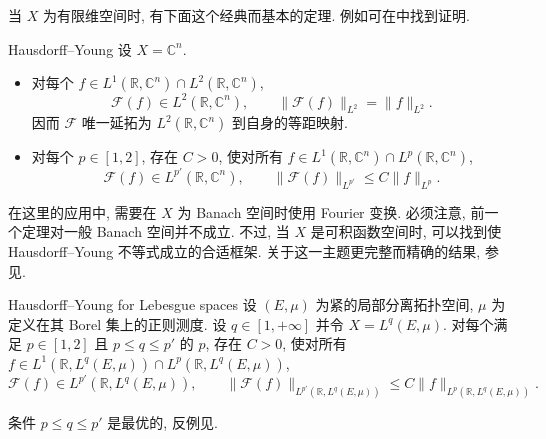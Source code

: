 当 $X$ 为有限维空间时, 有下面这个经典而基本的定理. 例如可在中找到证明.

\begin{Theorem}{Hausdorff--Young}
\label{thm:chap2-hausdorff-young-finite-dimensional}
设 $X=\mathbb{C}^n$.
\begin{itemize}
 \item 对每个 $f\in L^1(\mathbb{R},\mathbb{C}^n)\cap L^2(\mathbb{R},\mathbb{C}^n)$,
 \[
  \mathcal{F}(f)\in L^2(\mathbb{R},\mathbb{C}^n),
  \qquad
  \|\mathcal{F}(f)\|_{L^2}=\|f\|_{L^2}.
 \]
 因而 $\mathcal{F}$ 唯一延拓为 $L^2(\mathbb{R},\mathbb{C}^n)$ 到自身的等距映射.
 \item 对每个 $p\in[1,2]$, 存在 $C>0$, 使对所有
 $f\in L^1(\mathbb{R},\mathbb{C}^n)\cap L^p(\mathbb{R},\mathbb{C}^n)$,
 \[
  \mathcal{F}(f)\in L^{p'}(\mathbb{R},\mathbb{C}^n),
  \qquad
  \|\mathcal{F}(f)\|_{L^{p'}}\leq C\|f\|_{L^p}.
 \]
\end{itemize}
\end{Theorem}

在这里的应用中, 需要在 $X$ 为 Banach 空间时使用 Fourier 变换. 必须注意, 前一个定理对一般 Banach 空间并不成立. 不过, 当 $X$ 是可积函数空间时, 可以找到使 Hausdorff--Young 不等式成立的合适框架. 关于这一主题更完整而精确的结果, 参见.

\begin{Theorem}{Hausdorff--Young for Lebesgue spaces}
\label{thm:chap2-hausdorff-young-lebesgue-valued}
设 $(E,\mu)$ 为紧的局部分离拓扑空间, $\mu$ 为定义在其 Borel 集上的正则测度. 设 $q\in[1,+\infty]$ 并令 $X=L^q(E,\mu)$. 对每个满足 $p\in[1,2]$ 且 $p\leq q\leq p'$ 的 $p$, 存在 $C>0$, 使对所有
$f\in L^1(\mathbb{R},L^q(E,\mu))\cap L^p(\mathbb{R},L^q(E,\mu))$,
\[
 \mathcal{F}(f)\in L^{p'}(\mathbb{R},L^q(E,\mu)),
 \qquad
 \|\mathcal{F}(f)\|_{L^{p'}(\mathbb{R},L^q(E,\mu))}
 \leq C\|f\|_{L^p(\mathbb{R},L^q(E,\mu))}.
\]
\end{Theorem}

条件 $p\leq q\leq p'$ 是最优的, 反例见.

